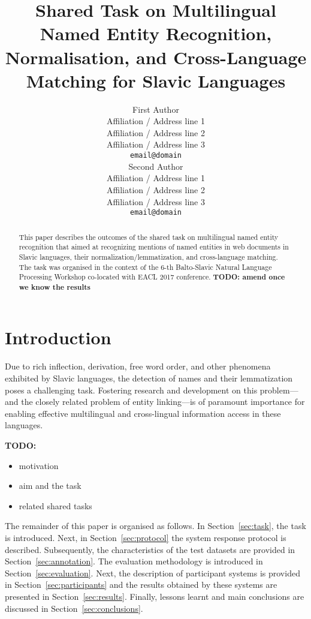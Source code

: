\documentclass[11pt]{article}
\title{Shared Task on Multilingual Named Entity Recognition, Normalisation, and Cross-Language Matching for Slavic Languages}
\author{First Author \\
  Affiliation / Address line 1 \\
  Affiliation / Address line 2 \\
  Affiliation / Address line 3 \\
  {\tt email@domain} \\\And
  Second Author \\
  Affiliation / Address line 1 \\
  Affiliation / Address line 2 \\
  Affiliation / Address line 3 \\
  {\tt email@domain} \\}
\date{}
\begin{document}
\maketitle
\begin{abstract}
This paper describes the outcomes of the shared task on multilingual named entity recognition 
that aimed at recognizing mentions of named entities in web documents in Slavic languages, 
their normalization/lemmatization, and cross-language matching. The task was organised in 
the context of the 6-th Balto-Slavic Natural Language Processing Workshop co-located with 
EACL 2017 conference. 
\textbf{TODO: amend once we know the results}
\end{abstract}

\section{Introduction}
\label{sec:intro}

Due to rich inflection, derivation, free word order, and other phenomena
exhibited by Slavic languages, the detection of names and their
lemmatization poses a challenging task.  Fostering research and
development on this problem---and the closely related problem of entity
linking---is of paramount importance for enabling effective multilingual
and cross-lingual information access in these languages.

\textbf{TODO:}

\begin{itemize}

\item motivation

\item aim and the task

\item related shared tasks

\end{itemize}

The remainder of this paper is organised as follows. In Section~\ref{sec:task},
the task is introduced. Next, in Section~\ref{sec:protocol} the system response
protocol is described.  Subsequently, the characteristics of the test datasets
are provided in Section~\ref{sec:annotation}. The evaluation methodology is
introduced in Section~\ref{sec:evaluation}.  Next, the description of
participant systems is provided in Section~\ref{sec:participants} and the
results obtained by these systems are presented in Section~\ref{sec:results}.
Finally, lessons learnt and main conclusions are discussed in
Section~\ref{sec:conclusions}.
\end{document}

